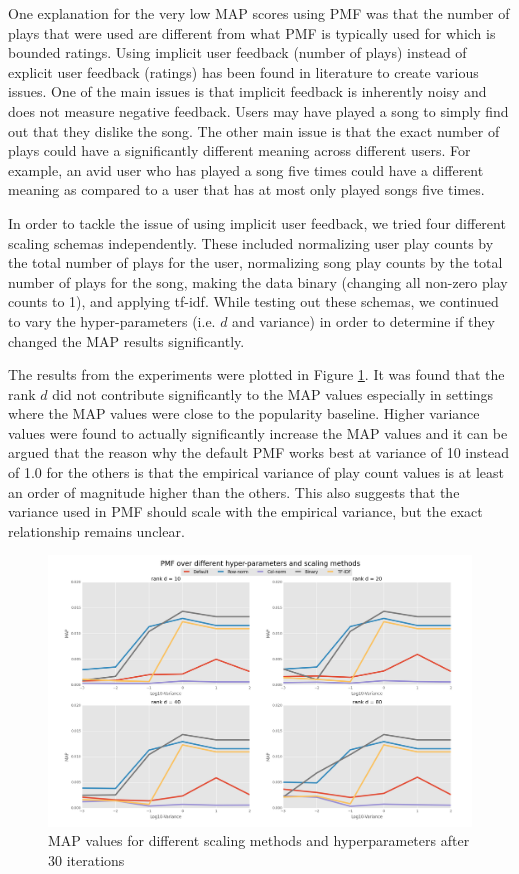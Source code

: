 \documentclass[11pt,preprint]{aastex}
\begin{document}
One explanation for the very low MAP scores using PMF was that the number of plays that were used are different from what PMF is typically used for which is bounded ratings. Using implicit user feedback (number of plays) instead of explicit user feedback (ratings) has been found in literature \citep{hu2008collaborative} to create various issues. One of the main issues is that implicit feedback is inherently noisy and does not measure negative feedback. Users may have played a song to simply find out that they dislike the song. The other main issue is that the exact number of plays could have a significantly different meaning across different users. For example, an avid user who has played a song five times could have a different meaning as compared to a user that has at most only played songs five times.
 
In order to tackle the issue of using implicit user feedback, we tried four different scaling schemas independently. These included normalizing user play counts by the total number of plays for the user, normalizing song play counts by the total number of plays for the song, making the data binary (changing all non-zero play counts to 1), and  applying tf-idf. While testing out these schemas, we continued to vary the hyper-parameters (i.e. $d$ and variance) in order to determine if they changed the MAP results significantly. 
 
The results from the experiments were plotted in Figure \ref{fig:PMF}. It was found that the rank $d$ did not contribute significantly to the MAP values especially in settings where the MAP values were close to the popularity baseline. Higher variance values were found to actually significantly increase the MAP values and it can be argued that the reason why the default PMF works best at variance of 10 instead of 1.0 for the others is that the empirical variance of play count values is at least an order of magnitude higher than the others. This also suggests that the variance used in PMF should scale with the empirical variance, but the exact relationship remains unclear.

\newpage
\begin{figure}[htbp] %
   \centering
   \includegraphics[width=6in]{../plots/final/PMF.png} 
   \caption{MAP values for different scaling methods and hyperparameters after 30 iterations}
   \label{fig:PMF}
\end{figure}
\end{document}
